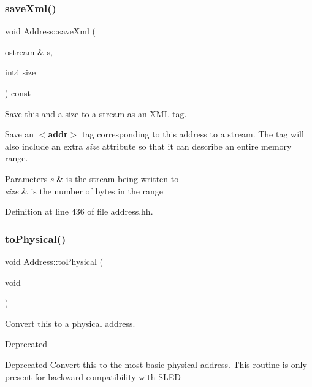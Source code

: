 \subsubsection{\texorpdfstring{saveXml()}{saveXml()}\hspace{0.1cm}{\footnotesize\ttfamily [2/2]}}
{\footnotesize\ttfamily void Address\+::save\+Xml (\begin{DoxyParamCaption}\item[{ostream \&}]{s,  }\item[{int4}]{size }\end{DoxyParamCaption}) const\hspace{0.3cm}{\ttfamily [inline]}}



Save this and a size to a stream as an X\+ML tag. 

Save an {\bfseries{$<$addr$>$}} tag corresponding to this address to a stream. The tag will also include an extra {\itshape size} attribute so that it can describe an entire memory range. 
\begin{DoxyParams}{Parameters}
{\em s} & is the stream being written to \\
\hline
{\em size} & is the number of bytes in the range \\
\hline
\end{DoxyParams}


Definition at line 436 of file address.\+hh.

\mbox{\label{class_address_a5dfb849ac01e7b1ca87d0ecbf5022dca}} 
\subsubsection{\texorpdfstring{toPhysical()}{toPhysical()}}
{\footnotesize\ttfamily void Address\+::to\+Physical (\begin{DoxyParamCaption}\item[{void}]{ }\end{DoxyParamCaption})}



Convert this to a physical address. 

\begin{DoxyRefDesc}{Deprecated}
\item[\mbox{\hyperlink{deprecated__deprecated000001}{Deprecated}}]Convert this to the most basic physical address. This routine is only present for backward compatibility with S\+L\+ED \end{DoxyRefDesc}


